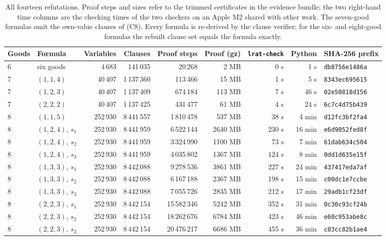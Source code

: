 \documentclass[11pt,a4paper]{article}
\theoremstyle{remark}
\begin{document}
\begin{table}[H]\centering\footnotesize
\begin{tabular}{@{}llrrrrrrl@{}}
\toprule
Goods & Formula & Variables & Clauses & Proof steps & Proof (gz) & \texttt{lrat-check} & Python & SHA-256 prefix \\
\midrule
6 & six goods & 4\,683 & 141\,035 & 20\,268 & 2 MB & 0 s & 1 s & \texttt{db8756e1486a} \\
7 & $(1,1,4)$ & 40\,407 & 1\,137\,360 & 113\,466 & 15 MB & 1 s & 5 s & \texttt{8343ec695615} \\
7 & $(1,2,3)$ & 40\,407 & 1\,137\,409 & 674\,184 & 113 MB & 7 s & 46 s & \texttt{02e50818d156} \\
7 & $(2,2,2)$ & 40\,407 & 1\,137\,425 & 431\,477 & 61 MB & 4 s & 24 s & \texttt{6c7c4d75b439} \\
8 & $(1,1,5)$ & 252\,930 & 8\,441\,557 & 1\,810\,478 & 537 MB & 38 s & 4 min & \texttt{d12fc3bf2fa4} \\
8 & $(1,2,4)$, $s_1$ & 252\,930 & 8\,441\,959 & 6\,522\,144 & 2640 MB & 230 s & 16 min & \texttt{e6d9052fed8f} \\
8 & $(1,2,4)$, $s_2$ & 252\,930 & 8\,441\,959 & 3\,324\,990 & 1100 MB & 73 s & 7 min & \texttt{61dab634c504} \\
8 & $(1,2,4)$, $s_3$ & 252\,930 & 8\,441\,959 & 4\,035\,802 & 1367 MB & 124 s & 8 min & \texttt{0dd1d635e15f} \\
8 & $(1,3,3)$, $s_1$ & 252\,930 & 8\,442\,088 & 9\,278\,536 & 3861 MB & 227 s & 24 min & \texttt{437417eda7af} \\
8 & $(1,3,3)$, $s_2$ & 252\,930 & 8\,442\,088 & 6\,167\,188 & 2367 MB & 198 s & 15 min & \texttt{c00dc1e7ccbe} \\
8 & $(1,3,3)$, $s_3$ & 252\,930 & 8\,442\,088 & 7\,055\,726 & 2835 MB & 212 s & 17 min & \texttt{29adb1cf23df} \\
8 & $(2,2,3)$, $s_1$ & 252\,930 & 8\,442\,154 & 15\,582\,346 & 5242 MB & 352 s & 31 min & \texttt{0c30c93cf24b} \\
8 & $(2,2,3)$, $s_2$ & 252\,930 & 8\,442\,154 & 18\,262\,676 & 6784 MB & 423 s & 46 min & \texttt{e60c953abe8c} \\
8 & $(2,2,3)$, $s_3$ & 252\,930 & 8\,442\,154 & 20\,476\,217 & 6686 MB & 455 s & 36 min & \texttt{c83cc82b1ae4} \\
\bottomrule
\end{tabular}
\caption{All fourteen refutations. Proof steps and sizes refer to the trimmed certificates in the evidence bundle; the two right-hand time columns are the checking times of the two checkers on an Apple M2 shared with other work. The seven-good formulas omit the own-value clauses of (C8). Every formula is re-derived by the clause verifier; for the six- and eight-good formulas the rebuilt clause set equals the formula exactly.}
\label{tab:registry}
\end{table}
\end{document}
